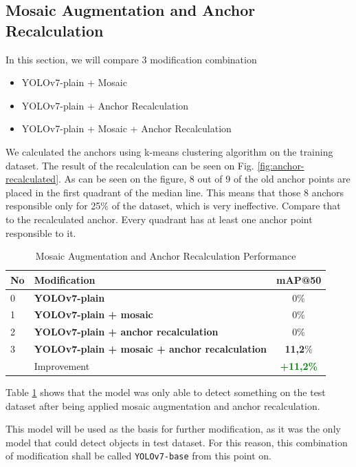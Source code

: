 \documentclass[conference]{IEEEtran}
\begin{document}
\subsection{Mosaic Augmentation and Anchor Recalculation}
In this section, we will compare 3 modification combination
\begin{itemize}
    \item YOLOv7-plain + Mosaic
    \item YOLOv7-plain + Anchor Recalculation
    \item YOLOv7-plain + Mosaic + Anchor Recalculation
\end{itemize}
We calculated the anchors using k-means clustering algorithm on the
training dataset. The result of the recalculation can be seen on Fig. \ref{fig:anchor-recalculated}.
As can be seen on the figure, 8 out of 9 of the old anchor points are placed in the first quadrant
of the median line. This means that those 8 anchors responsible only for 25\% of the dataset, which
is very ineffective. Compare that to the recalculated anchor. Every quadrant has at least one anchor
point responsible to it.
\begin{table}[htbp]
  \centering
  \caption{Mosaic Augmentation and Anchor Recalculation Performance}
  \label{tbl:mosaic_reanchor_performance}
  \vspace{-1ex}
  \begin{tabular}{ l l c }
    \toprule[1.5pt]
    No & Modification        &mAP@50 \\
    \midrule
    0  & \textbf{YOLOv7-plain               }& 0\%\\
    1  & \textbf{YOLOv7-plain + mosaic                     }& 0\%\\
    2  & \textbf{YOLOv7-plain + anchor recalculation         }& 0\%\\
    3  & \textbf{YOLOv7-plain + mosaic + anchor recalculation}& \textbf{11,2}\%\\
    \midrule
       & Improvement                         & \textbf{\textcolor{green}{+11,2\%}}\\
    \bottomrule[1.5pt]
  \end{tabular}
\end{table}
Table \ref{tbl:mosaic_reanchor_performance} shows that the model was only able
to detect something on the test dataset after being applied mosaic augmentation
and anchor recalculation.

This model will be used as the basis for further 
modification, as it was the only model that could detect objects in test dataset.
For this reason, this combination of modification shall be called \verb*|YOLOv7-base|
from this point on.
\end{document}
